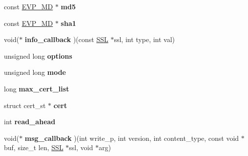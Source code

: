 \begin{DoxyCompactItemize}
\item 
\hypertarget{structssl__ctx__st_a0d2c62fc7903597eef4c4890ba327a16}{}const \hyperlink{structenv__md__st}{E\+V\+P\+\_\+\+M\+D} $\ast$ {\bfseries md5}\label{structssl__ctx__st_a0d2c62fc7903597eef4c4890ba327a16}

\item 
\hypertarget{structssl__ctx__st_ae6ea4c79f3be1d3c103b290e08009204}{}const \hyperlink{structenv__md__st}{E\+V\+P\+\_\+\+M\+D} $\ast$ {\bfseries sha1}\label{structssl__ctx__st_ae6ea4c79f3be1d3c103b290e08009204}

\item 
\hypertarget{structssl__ctx__st_aad6ab81d36b3ea41bc75aa86586396dc}{}void($\ast$ {\bfseries info\+\_\+callback} )(const \hyperlink{structssl__st}{S\+S\+L} $\ast$ssl, int type, int val)\label{structssl__ctx__st_aad6ab81d36b3ea41bc75aa86586396dc}

\item 
\hypertarget{structssl__ctx__st_aeca7f42401b9a9465d47a206f155f6ba}{}unsigned long {\bfseries options}\label{structssl__ctx__st_aeca7f42401b9a9465d47a206f155f6ba}

\item 
\hypertarget{structssl__ctx__st_a15675b65ff5a91cc12c75247cec9c90e}{}unsigned long {\bfseries mode}\label{structssl__ctx__st_a15675b65ff5a91cc12c75247cec9c90e}

\item 
\hypertarget{structssl__ctx__st_a7ee4c1615f56a2034547f06d040613df}{}long {\bfseries max\+\_\+cert\+\_\+list}\label{structssl__ctx__st_a7ee4c1615f56a2034547f06d040613df}

\item 
\hypertarget{structssl__ctx__st_a12fd74ab996b83c38cd73136a1163471}{}struct cert\+\_\+st $\ast$ {\bfseries cert}\label{structssl__ctx__st_a12fd74ab996b83c38cd73136a1163471}

\item 
\hypertarget{structssl__ctx__st_a454cbb1294b6b36ab36cff39c541ba70}{}int {\bfseries read\+\_\+ahead}\label{structssl__ctx__st_a454cbb1294b6b36ab36cff39c541ba70}

\item 
\hypertarget{structssl__ctx__st_ada261e72ed5d3ce460ca6dcf34ec53dd}{}void($\ast$ {\bfseries msg\+\_\+callback} )(int write\+\_\+p, int version, int content\+\_\+type, const void $\ast$buf, size\+\_\+t len, \hyperlink{structssl__st}{S\+S\+L} $\ast$ssl, void $\ast$arg)\label{structssl__ctx__st_ada261e72ed5d3ce460ca6dcf34ec53dd}


\end{DoxyCompactItemize}
